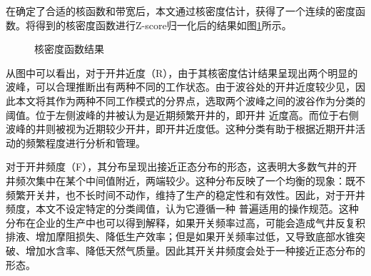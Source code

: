 在确定了合适的核函数和带宽后，本文通过核密度估计，获得了一个连续的密度函数。将得到的核密度函数进行Z-score归一化后的结果如图\ref{fig:KDE}所示。
\begin{figure}[H]
    \centering
    \hfil
    \hfil
    \caption{核密度函数结果}
    \label{fig:KDE}
\end{figure}
\par
从图中可以看出，对于开井近度（R），由于其核密度估计结果呈现出两个明显的波峰，可以合理推断出有两种不同的工作状态。由于波谷处的开井近度较少见，因此本文将其作为两种不同工作模式的分界点，选取两个波峰之间的波谷作为分类的阈值。位于左侧波峰的井被认为是近期频繁开井的，即开井
近度高。而位于右侧波峰的井则被视为近期较少开井，即开井近度低。这种分类有助于根据近期开井活动的频繁程度进行分析和管理。

对于开井频度（F），其分布呈现出接近正态分布的形态，这表明大多数气井的开井频次集中在某个中间值附近，两端较少。这种分布反映了一个均衡的现象：既不频繁开关井，也不长时间不动作，维持了生产的稳定性和有效性。因此，对于开井频度，本文不设定特定的分类阈值，认为它遵循一种
普遍适用的操作规范。这种分布在企业的生产中也可以得到解释，如果开关频率过高，可能会造成气井反复积排液、增加摩阻损失、降低生产效率；但是如果开关频率过低，又导致底部水锥突破、增加水含率、降低天然气质量。因此其开关井频度会处于一种接近正态分布的形态。

